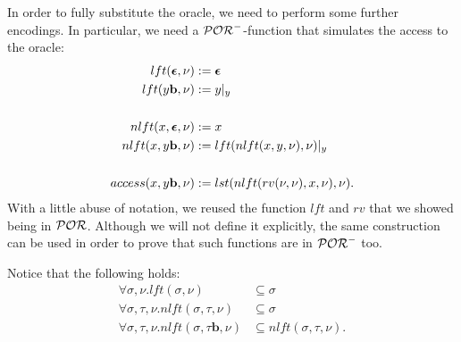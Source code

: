 In order to fully substitute the oracle,
we need to perform some
further encodings.
In particular, we need a $\mathcal{POR}^-$-function
that simulates the access to the oracle:
\begin{align*}
lft({\bm{\epsilon}},\nu) &:= \bm{\epsilon} \\
lft(y{\mathbf{b}},\nu) &:= y|_y \\
\\
nlft(x,\bm{\epsilon},\nu) &:= x \\
nlft(x,y\mathbf{b},\nu) &:= lft(nlft(x,y,\nu),\nu)|_y \\
\\
access(x,y\mathbf{b},\nu) &:= lst(nlft(rv(\nu,\nu),x,\nu),\nu).
\end{align*}
With a little abuse of notation,
we reused the function
$lft$ and $rv$ that we showed being in $\mathcal{POR}$.
Although we will not {define} it explicitly,
the same construction can be used in order
to prove that such functions are in
$\mathcal{POR}^-$ too.

\begin{remark}
Notice that the following holds:
\begin{align*}
\forall \sigma, \nu .lft(\sigma, \nu) &\subseteq \sigma \\
\forall \sigma,\tau,\nu .nlft(\sigma,\tau,\nu) &\subseteq \sigma \\
\forall \sigma,\tau,\nu .nlft(\sigma,\tau \mathbf{b},\nu)
&\subseteq nlft(\sigma,\tau,\nu).
\end{align*}
\end{remark}

